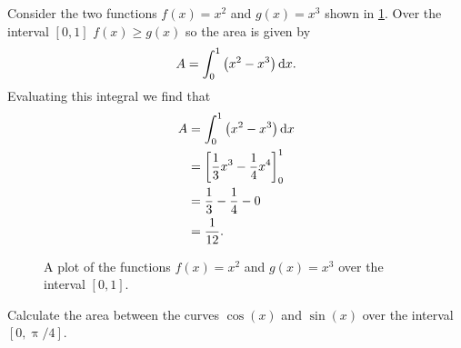 \begin{ex}
Consider the two functions $f(x)=x^{2}$ and $g(x)=x^{3}$ shown in \cref{fig: area between functions}. Over the interval $[0,1]$ $f(x)\geq g(x)$ so the area is given by
\begin{equation*}
A=\int_{0}^{1}\left(x^{2}-x^{3}\right)\mathrm{d} x.
\end{equation*}
Evaluating this integral we find that
\begin{align*}
A 	&=\int_{0}^{1}\left(x^{2}-x^{3}\right)\mathrm{d} x\\
	&=\left[\frac{1}{3}x^{3}-\frac{1}{4}x^{4}\right]_{0}^{1}\\
	&=\frac{1}{3}-\frac{1}{4}-0\\
	&=\frac{1}{12}.
\end{align*}
\end{ex}
\begin{figure}[ht]
    \centering
{}
    \caption{A plot of the functions $f(x)=x^{2}$ and $g(x)=x^{3}$ over the interval $[0,1]$.}
        \label{fig: area between functions}
\end{figure}


\begin{exercise}
Calculate the area between the curves $\cos(x)$ and $\sin(x)$ over the interval $[0,\uppi/4]$.
\end{exercise}